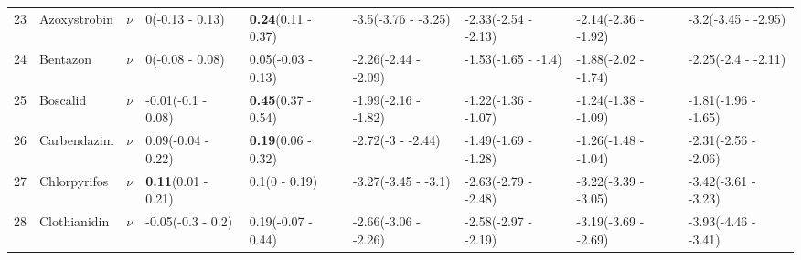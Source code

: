 \begin{landscape}
\begin{longtable}{lp{2cm}p{0.6cm}p{1.8cm}p{1.8cm}p{1.8cm}p{1.8cm}p{1.8cm}p{1.8cm}}
   \midrule
23 & Azoxystrobin & $\nu$ & 0\newline (-0.13 - 0.13) & \textbf{0.24}\newline (0.11 - 0.37) & -3.5\newline (-3.76 - -3.25) & -2.33\newline (-2.54 - -2.13) & -2.14\newline (-2.36 - -1.92) & -3.2\newline (-3.45 - -2.95) \\ 
  24 & Bentazon & $\nu$ & 0\newline (-0.08 - 0.08) & 0.05\newline (-0.03 - 0.13) & -2.26\newline (-2.44 - -2.09) & -1.53\newline (-1.65 - -1.4) & -1.88\newline (-2.02 - -1.74) & -2.25\newline (-2.4 - -2.11) \\ 
  25 & Boscalid & $\nu$ & -0.01\newline (-0.1 - 0.08) & \textbf{0.45}\newline (0.37 - 0.54) & -1.99\newline (-2.16 - -1.82) & -1.22\newline (-1.36 - -1.07) & -1.24\newline (-1.38 - -1.09) & -1.81\newline (-1.96 - -1.65) \\ 
  26 & Carbendazim & $\nu$ & 0.09\newline (-0.04 - 0.22) & \textbf{0.19}\newline (0.06 - 0.32) & -2.72\newline (-3 - -2.44) & -1.49\newline (-1.69 - -1.28) & -1.26\newline (-1.48 - -1.04) & -2.31\newline (-2.56 - -2.06) \\ 
  27 & Chlorpyrifos & $\nu$ & \textbf{0.11}\newline (0.01 - 0.21) & 0.1\newline (0 - 0.19) & -3.27\newline (-3.45 - -3.1) & -2.63\newline (-2.79 - -2.48) & -3.22\newline (-3.39 - -3.05) & -3.42\newline (-3.61 - -3.23) \\ 
  28 & Clothianidin & $\nu$ & -0.05\newline (-0.3 - 0.2) & 0.19\newline (-0.07 - 0.44) & -2.66\newline (-3.06 - -2.26) & -2.58\newline (-2.97 - -2.19) & -3.19\newline (-3.69 - -2.69) & -3.93\newline (-4.46 - -3.41) \\ 

\end{longtable}
\end{landscape}
